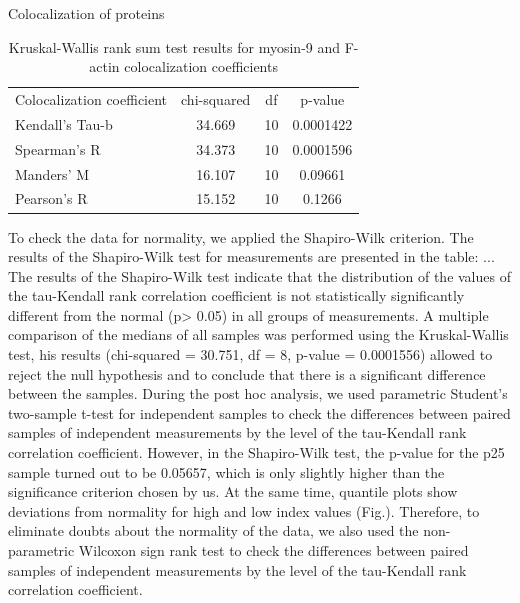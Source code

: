 \documentclass[english,authoryear]{elsarticle}
\begin{document}
Colocalization of proteins

\begin{table}
  \caption{Kruskal-Wallis rank sum test results for myosin-9 and F-actin colocalization coefficients}
  \label{fig:fig4}
\centering
\begin{tabular}{l|ccc}
 Colocalization coefficient & chi-squared & df & p-value  \\
 Kendall's Tau-b & 34.669 & 10 & 0.0001422 \\
 Spearman's R & 34.373 & 10 &  0.0001596 \\
 Manders' M & 16.107 & 10 & 0.09661 \\
 Pearson's R & 15.152 & 10 & 0.1266

\end{tabular}
\end{table}

To check the data for normality, we applied the Shapiro-Wilk criterion.
The results of the Shapiro-Wilk test for measurements are presented in the table:
...
The results of the Shapiro-Wilk test indicate that the distribution of the values of the tau-Kendall rank correlation coefficient is not statistically significantly different from the normal (p> 0.05) in all groups of measurements. A multiple comparison of the medians of all samples was performed using the Kruskal-Wallis test, his results (chi-squared = 30.751, df = 8, p-value = 0.0001556) allowed to reject the null hypothesis and to conclude that there is a significant difference between the samples.
 During the post hoc analysis, we used parametric Student’s two-sample t-test for independent samples to check the differences between paired samples of independent measurements by the level of the tau-Kendall rank correlation coefficient.
However, in the Shapiro-Wilk test, the p-value for the p25 sample turned out to be 0.05657, which is only slightly higher than the significance criterion chosen by us. At the same time, quantile plots show deviations from normality for high and low index values (Fig.).
Therefore, to eliminate doubts about the normality of the data, we also used the non-parametric Wilcoxon sign rank test to check the differences between paired samples of independent measurements by the level of the tau-Kendall rank correlation coefficient.
\end{document}
